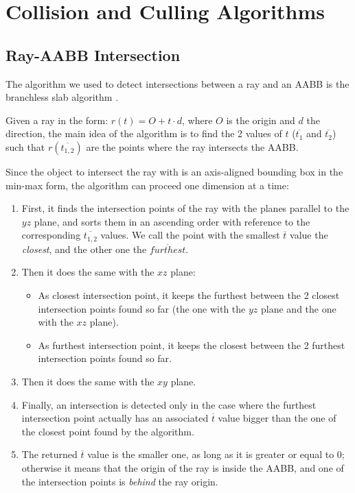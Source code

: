 \documentclass{PoliMi_MasterThesis}
\begin{document}


\cleardoublepage
{} %
\appendix

\chapter{Collision and Culling Algorithms}
\section{Ray-AABB Intersection} \label{sec:ray_box_intersection}
The algorithm we used to detect intersections between a ray and an AABB is the branchless slab algorithm \cite{ray_box_intersection}.

Given a ray in the form: $r(t) = O + t\cdot d$, where $O$ is the origin and $d$ the direction, the main idea of the algorithm is to find the 2 values of $t$ ($\overline{t_1}$ and $\overline{t_2}$) such that $r(\overline{t_{1,2}})$ are the points where the ray intersects the AABB.

Since the object to intersect the ray with is an axis-aligned bounding box in the min-max form, the algorithm can proceed one dimension at a time:
\begin{enumerate}
	\item First, it finds the intersection points of the ray with the planes parallel to the $yz$ plane, and sorts them in an ascending order with reference to the corresponding $\overline{t_{1,2}}$ values. We call the point with the smallest $\overline{t}$ value the \textit{closest}, and the other one the $\overline{furthest}$.
	\item Then it does the same with the $xz$ plane:
	\begin{itemize}
		\item As closest intersection point, it keeps the furthest between the 2 closest intersection points found so far (the one with the $yz$ plane and the one with the $xz$ plane).
		\item As furthest intersection point, it keeps the closest between the 2 furthest intersection points found so far.
	\end{itemize}
	\item Then it does the same with the $xy$ plane.
	\item Finally, an intersection is detected only in the case where the furthest intersection point actually has an associated $\overline{t}$ value bigger than the one of the closest point found by the algorithm.
	\item The returned $\overline{t}$ value is the smaller one, as long as it is greater or equal to 0; otherwise it means that the origin of the ray is inside the AABB, and one of the intersection points is \textit{behind} the ray origin.
\end{enumerate}
	
\end{document}
